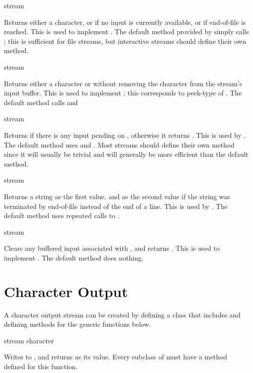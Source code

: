  {stream}

Returns either a character, or  if no input is currently available, or
 if end-of-file is reached.  This is used to implement
.  The default method provided by
 simply calls ; this
is sufficient for file streams, but interactive streams should define their own
method.

 {stream}

Returns either a character or  without removing the character from the
stream's input buffer.  This is used to implement ; this
corresponds to peek-type of .  The default method calls
 and 

 {stream}

Returns  if there is any input pending on , otherwise it
returns .  This is used by .  The default method uses
 and .  Most streams should
define their own method since it will usually be trivial and will generally be
more efficient than the default method.

 {stream}

Returns a string as the first value, and  as the second value if the
string was terminated by end-of-file instead of the end of a line.  This is used
by .  The default method uses repeated calls to
.

 {stream}

Clears any buffered input associated with , and returns
.  This is used to implement .  The default method
does nothing.


\section {Character Output}

A character output stream can be created by defining a class that includes
 and defining methods for the generic
functions below.

 {stream character}

Writes  to , and returns  as its
value.  Every subclass of  must have a
method defined for this function.

